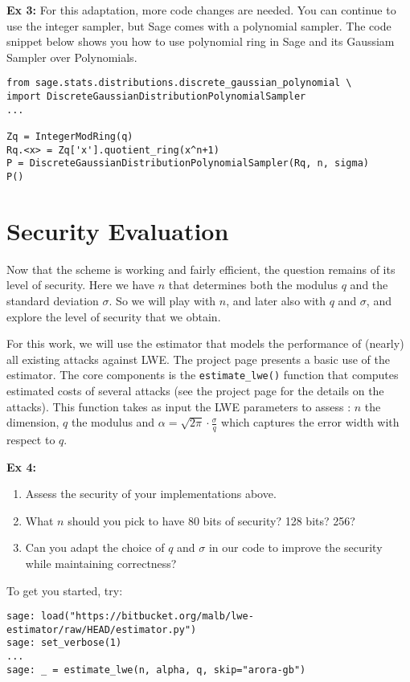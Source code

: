 \documentclass[10pt,a4paper,nobib]{tufte-handout}
\begin{document}
\textbf{Ex 3:} For this adaptation, more code changes are needed. You can continue to use the integer sampler, but Sage comes with a polynomial sampler. The code snippet below shows you how to use polynomial ring in Sage and its Gaussiam Sampler over Polynomials.
\lstset{language=sage,label= ,caption= ,captionpos=b,numbers=none}
\begin{lstlisting}
from sage.stats.distributions.discrete_gaussian_polynomial \
import DiscreteGaussianDistributionPolynomialSampler
...

Zq = IntegerModRing(q)
Rq.<x> = Zq['x'].quotient_ring(x^n+1)
P = DiscreteGaussianDistributionPolynomialSampler(Rq, n, sigma)
P()
\end{lstlisting}


\section{Security Evaluation}

Now that the scheme is working and fairly efficient, the question remains of its level of security. Here we have $n$ that determines both the modulus $q$ and the standard deviation $\sigma$. So we will play with $n$, and later also with $q$ and $\sigma$, and explore the level of security that we obtain.

For this work, we will use the estimator that models the performance of (nearly) all existing attacks against LWE\@. The project page presents a basic use of the estimator. The core components is the \texttt{estimate\_lwe()} function that computes estimated costs of several attacks (see the project page for the details on the attacks). This function takes as input the LWE parameters to assess : $n$ the dimension, $q$ the modulus and $\alpha = \sqrt{2\pi}\cdot \frac{\sigma}{q}$ which captures the error width with respect to $q$. 

\textbf{Ex 4:}
\begin{enumerate}
  \item Assess the security of your implementations above.
  \item What $n$ should you pick to have 80 bits of security? 128 bits? 256?
  \item Can you adapt the choice of $q$ and $\sigma$ in our code to improve the security while maintaining correctness?
\end{enumerate}

To get you started, try:

\lstset{language=sage,label= ,caption= ,captionpos=b,numbers=none}
\begin{lstlisting}
sage: load("https://bitbucket.org/malb/lwe-estimator/raw/HEAD/estimator.py")
sage: set_verbose(1)
...
sage: _ = estimate_lwe(n, alpha, q, skip="arora-gb")
\end{lstlisting}
\end{document}
